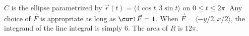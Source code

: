 {$C$ is the ellipse parametrized by $\vec r(t) = \langle 4\cos t,3\sin t\rangle$ on $0\leq t\leq 2\pi$. 
}
{Any choice of $\vec F$ is appropriate as long as $\curl \vec F = 1$. When $\vec F = \langle -y/2,x/2\rangle$, the integrand of the line integral is simply 6. The area of $R$ is $12\pi$.
}
